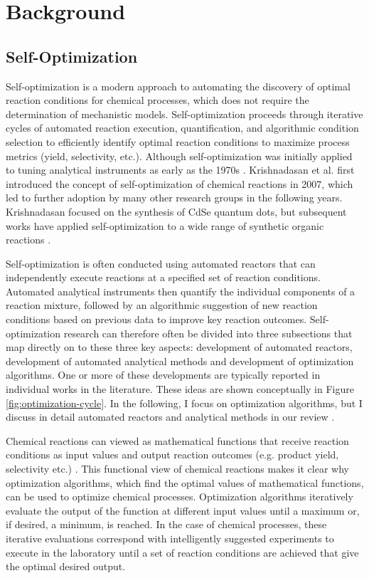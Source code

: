 \section{Background}

\subsection{Self-Optimization}

Self-optimization is a modern approach to automating the discovery of optimal reaction conditions for chemical processes, which does not require the determination of mechanistic models. Self-optimization proceeds through iterative cycles of automated reaction execution, quantification, and algorithmic condition selection to efficiently identify optimal reaction conditions to maximize process metrics (yield, selectivity, etc.). Although self-optimization was initially applied to tuning analytical instruments as early as the 1970s \cite{Routh1977}. Krishnadasan et al. \cite{Krishnadasan2007} first introduced the concept of self-optimization of chemical reactions in 2007, which led to further adoption by many other research groups in the following years. Krishnadasan focused on the synthesis of CdSe quantum dots, but subsequent works have applied self-optimization to a wide range of synthetic organic reactions \cite{McMullen2010a, McMullen2011, Bourne2011, Moore2012, christensen2021, Reizman2016b, Fitzpatrick2016,Echtermeyer2017}.

Self-optimization is often conducted using automated reactors that can independently execute reactions at a specified set of reaction conditions. Automated analytical instruments then quantify the individual components of a reaction mixture, followed by an algorithmic suggestion of new reaction conditions based on previous data to improve key reaction outcomes. Self-optimization research can therefore often be divided into three subsections that map directly on to these three key aspects: development of automated reactors, development of automated analytical methods and development of optimization algorithms. One or more of these developments are typically reported in individual works in the literature. These ideas are shown conceptually in Figure \ref{fig:optimization-cycle}.  In the following, I focus on optimization algorithms, but I discuss in detail automated reactors and analytical methods in our review \cite{Taylor2023a}.

Chemical reactions can viewed as mathematical functions that receive reaction conditions as input values and output reaction outcomes (e.g. product yield, selectivity etc.) \cite{Clayton2019}. This functional view of chemical reactions makes it clear why optimization algorithms, which find the optimal values of mathematical functions, can be used to optimize chemical processes. Optimization algorithms iteratively evaluate the output of the function at different input values until a maximum or, if desired, a minimum, is reached. In the case of chemical processes, these iterative evaluations correspond with intelligently suggested experiments to execute in the laboratory until a set of reaction conditions are achieved that give the optimal desired output.

